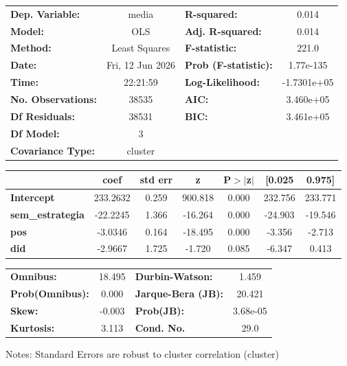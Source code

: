\begin{center}
\begin{tabular}{lclc}
\toprule
\textbf{Dep. Variable:}    &      media       & \textbf{  R-squared:         } &      0.014   \\
\textbf{Model:}            &       OLS        & \textbf{  Adj. R-squared:    } &      0.014   \\
\textbf{Method:}           &  Least Squares   & \textbf{  F-statistic:       } &      221.0   \\
\textbf{Date:}             & Fri, 12 Jun 2026 & \textbf{  Prob (F-statistic):} &  1.77e-135   \\
\textbf{Time:}             &     22:21:59     & \textbf{  Log-Likelihood:    } & -1.7301e+05  \\
\textbf{No. Observations:} &       38535      & \textbf{  AIC:               } &  3.460e+05   \\
\textbf{Df Residuals:}     &       38531      & \textbf{  BIC:               } &  3.461e+05   \\
\textbf{Df Model:}         &           3      & \textbf{                     } &              \\
\textbf{Covariance Type:}  &     cluster      & \textbf{                     } &              \\
\bottomrule
\end{tabular}
\begin{tabular}{lcccccc}
                         & \textbf{coef} & \textbf{std err} & \textbf{z} & \textbf{P$> |$z$|$} & \textbf{[0.025} & \textbf{0.975]}  \\
\midrule
\textbf{Intercept}       &     233.2632  &        0.259     &   900.818  &         0.000        &      232.756    &      233.771     \\
\textbf{sem\_estrategia} &     -22.2245  &        1.366     &   -16.264  &         0.000        &      -24.903    &      -19.546     \\
\textbf{pos}             &      -3.0346  &        0.164     &   -18.495  &         0.000        &       -3.356    &       -2.713     \\
\textbf{did}             &      -2.9667  &        1.725     &    -1.720  &         0.085        &       -6.347    &        0.413     \\
\bottomrule
\end{tabular}
\begin{tabular}{lclc}
\textbf{Omnibus:}       & 18.495 & \textbf{  Durbin-Watson:     } &    1.459  \\
\textbf{Prob(Omnibus):} &  0.000 & \textbf{  Jarque-Bera (JB):  } &   20.421  \\
\textbf{Skew:}          & -0.003 & \textbf{  Prob(JB):          } & 3.68e-05  \\
\textbf{Kurtosis:}      &  3.113 & \textbf{  Cond. No.          } &     29.0  \\
\bottomrule
\end{tabular}
\end{center}

Notes: \newline
 [1] Standard Errors are robust to cluster correlation (cluster)